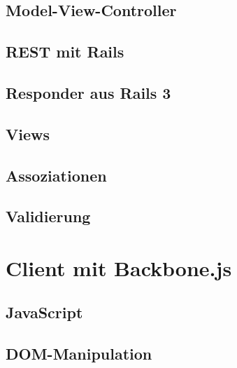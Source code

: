
\subsection{Model-View-Controller}


\subsection{REST mit Rails}


\subsection{Responder aus Rails 3}


\subsection{Views}


\subsection{Assoziationen}


\subsection{Validierung}


\section[Client]{Client mit Backbone.js}


\subsection{JavaScript}


\subsection{DOM-Manipulation}

